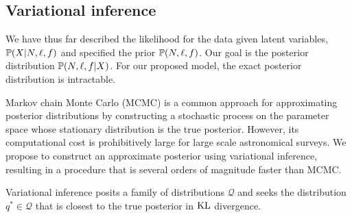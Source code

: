 \subsection{Variational inference}
We have thus far described the likelihood for the data given latent variables,
$\mathbb{P}(X | N, \ell, f)$ and specified the prior $\mathbb{P}(N, \ell, f)$. Our goal is
the posterior distribution $\mathbb{P}(N, \ell, f | X)$. For our proposed model,
the exact posterior distribution is intractable.

Markov chain Monte Carlo (MCMC) is a common approach for approximating
posterior distributions by constructing a stochastic process on the parameter space
whose stationary distribution is the true posterior. However,
its computational cost is prohibitively large for
large scale astronomical surveys. We propose to construct an approximate posterior
using variational inference, resulting in a procedure that is several orders of
magnitude faster than MCMC.

Variational inference posits a family of distributions $\mathcal{Q}$ and seeks
the distribution $q^*\in \mathcal{Q}$ that is closest to the true posterior
in $\textrm{KL}$ divergence.



